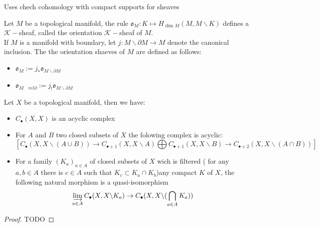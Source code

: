 Uses chech cohomology with compact supports for sheaves 

\begin{definition}\label{def:orientation_sheaf_of_a_manifold}
    Let $M$ be a topological manifold, the rule $\mathfrak{o}_M:K\mapsto H_{\dim M}(M,M\backslash K)$ defines a $\mathcal{K}-$sheaf, called the orientation $\mathcal{K}-$sheaf of $M$.\\

    If $M$ is a manifold with boundary, let $j:M\backslash \partial M\to M$ denote the canonical inclusion. The the orientation shaeves of $M$ are defined as follows:\begin{itemize}
        \item $\mathfrak{o}_M:= j_*\mathfrak{o}_{M\backslash \partial M}$
        \item $\mathfrak{o}_{M\quad rel \partial}:= j_!\mathfrak{o}_{M\backslash \partial M}$
    \end{itemize}

\end{definition}

\begin{lemma}\label{lem:Homotopy_k-sheaf_axioms_for_singular_chain}
    Let $X$ be a topological manifold, then we have: \begin{itemize}
    \item $C_{\bullet}(X,X)$ is an acyclic complex
    \item For $A$ and $B$ two closed subsets of $X$ the folowing complex is acyclic: \[ [C_{\bullet}(X,X\backslash (A\cup B))\to C_{\bullet+1}(X,X\backslash A)\bigoplus C_{\bullet+1}(X,X\backslash B)\to C_{\bullet+2}(X,X\backslash (A\cap B)) ]\]
    \item For a family $(K_a)_{a\in A}$ of closed subsets of $X$ wich is filtered ( for any $a,b\in A$ there is $c\in A$ such that $K_c\subset K_a\cap K_b$)any compact $K$ of $X$, the following natural morphism is a quasi-isomorphism \[\varinjlim\limits_{a\in A} C_{\bullet}(X,X\backslash K_a)\to C_{\bullet}(X,X\backslash (\bigcap\limits_{a\in A}K_a))\]
    \end{itemize}

\end{lemma}

\begin{proof}
    TODO
\end{proof}


